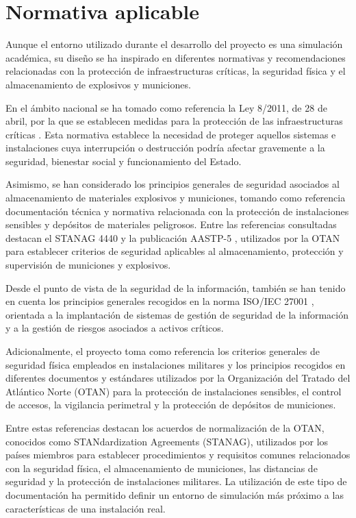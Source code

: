 \section{Normativa aplicable}

Aunque el entorno utilizado durante el desarrollo del proyecto es una simulación académica, su diseño se ha inspirado en diferentes normativas y recomendaciones relacionadas con la protección de infraestructuras críticas, la seguridad física y el almacenamiento de explosivos y municiones.

En el ámbito nacional se ha tomado como referencia la Ley 8/2011, de 28 de abril, por la que se establecen medidas para la protección de las infraestructuras críticas \cite{ley811}. Esta normativa establece la necesidad de proteger aquellos sistemas e instalaciones cuya interrupción o destrucción podría afectar gravemente a la seguridad, bienestar social y funcionamiento del Estado.

Asimismo, se han considerado los principios generales de seguridad asociados al almacenamiento de materiales explosivos y municiones, tomando como referencia documentación técnica y normativa relacionada con la protección de instalaciones sensibles y depósitos de materiales peligrosos. Entre las referencias consultadas destacan el STANAG 4440 \cite{stanag4440} y la publicación AASTP-5 \cite{aastp5}, utilizados por la OTAN para establecer criterios de seguridad aplicables al almacenamiento, protección y supervisión de municiones y explosivos.

Desde el punto de vista de la seguridad de la información, también se han tenido en cuenta los principios generales recogidos en la norma ISO/IEC 27001 \cite{iso27001}, orientada a la implantación de sistemas de gestión de seguridad de la información y a la gestión de riesgos asociados a activos críticos.

Adicionalmente, el proyecto toma como referencia los criterios generales de seguridad física empleados en instalaciones militares y los principios recogidos en diferentes documentos y estándares utilizados por la Organización del Tratado del Atlántico Norte (OTAN) para la protección de instalaciones sensibles, el control de accesos, la vigilancia perimetral y la protección de depósitos de municiones.

Entre estas referencias destacan los acuerdos de normalización de la OTAN, conocidos como STANdardization Agreements (STANAG), utilizados por los países miembros para establecer procedimientos y requisitos comunes relacionados con la seguridad física, el almacenamiento de municiones, las distancias de seguridad y la protección de instalaciones militares. La utilización de este tipo de documentación ha permitido definir un entorno de simulación más próximo a las características de una instalación real.

